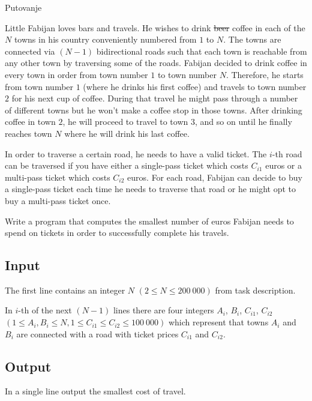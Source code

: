 \begin{statement}[
  problempoints=110,
  timelimit=1 second,
  memorylimit=512 MiB,
]{Putovanje}

Little Fabijan loves bars and travels. He wishes to drink \sout{beer} coffee in
each of the $N$ towns in his country conveniently numbered from $1$ to $N$.
The towns are connected via $(N - 1)$ bidirectional roads such that each town
is reachable from any other town by traversing some of the roads. Fabijan
decided to drink coffee in every town in order from town number $1$ to town
number $N$.  Therefore, he starts from town number $1$ (where he drinks his
first coffee) and travels to town number $2$ for his next cup of coffee.
During that travel he might pass through a number of different towns but he
won't make a coffee stop in those towns. After drinking coffee in town $2$,
he will proceed to travel to town $3$, and so on until he finally reaches
town $N$ where he will drink his last coffee.

In order to traverse a certain road, he needs to have a valid ticket. The $i$-th
road can be traversed if you have either a single-pass ticket which costs $C_{i1}$
euros or a multi-pass ticket which costs $C_{i2}$ euros. For each road, Fabijan can
decide to buy a single-pass ticket each time he needs to traverse that road or
he might opt to buy a multi-pass ticket once.

Write a program that computes the smallest number of euros Fabijan needs to spend
on tickets in order to successfully complete his travels.

\subsection*{Input}
The first line contains an integer $N$ $(2 \le N \le 200\ 000)$ from task
description.

In $i$-th of the next $(N - 1)$ lines there are four integers $A_i$, $B_i$,
$C_{i1}$, $C_{i2}$ $(1 \le A_i, B_i \le N, 1 \le C_{i1} \le C_{i2} \le 100\
000)$ which represent that towns $A_i$ and $B_i$ are connected with
a road with ticket prices $C_{i1}$ and $C_{i2}$.

\subsection*{Output}
In a single line output the smallest cost of travel.


\end{statement}

